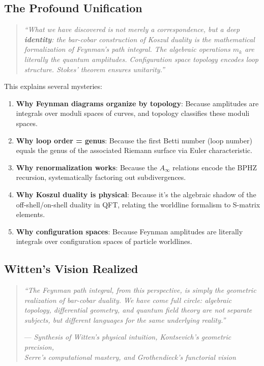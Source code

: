 \subsection{The Profound Unification}

\begin{quote}
\textit{``What we have discovered is not merely a correspondence, but a deep 
\textbf{identity}: the bar-cobar construction of Koszul duality \emph{is} the 
mathematical formalization of Feynman's path integral. The algebraic operations 
$m_k$ are literally the quantum amplitudes. Configuration space topology encodes 
loop structure. Stokes' theorem ensures unitarity.''}
\end{quote}

This explains several mysteries:

\begin{enumerate}
\item \textbf{Why Feynman diagrams organize by topology}: Because amplitudes are 
integrals over moduli spaces of curves, and topology classifies these moduli spaces.

\item \textbf{Why loop order = genus}: Because the first Betti number (loop number) 
equals the genus of the associated Riemann surface via Euler characteristic.

\item \textbf{Why renormalization works}: Because the $A_\infty$ relations encode 
the BPHZ recursion, systematically factoring out subdivergences.

\item \textbf{Why Koszul duality is physical}: Because it's the algebraic shadow of 
the off-shell/on-shell duality in QFT, relating the worldline formalism to S-matrix 
elements.

\item \textbf{Why configuration spaces}: Because Feynman amplitudes are literally 
integrals over configuration spaces of particle worldlines.
\end{enumerate}

\subsection{Witten's Vision Realized}

\begin{quote}
\textit{``The Feynman path integral, from this perspective, is simply the geometric 
realization of bar-cobar duality. We have come full circle: algebraic topology, 
differential geometry, and quantum field theory are not separate subjects, but 
different languages for the same underlying reality.''}

--- \textit{Synthesis of Witten's physical intuition, Kontsevich's geometric precision, \\
Serre's computational mastery, and Grothendieck's functorial vision}
\end{quote}

